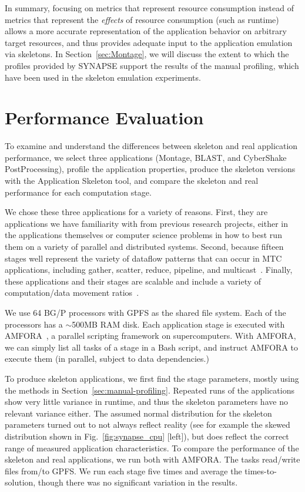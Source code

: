 \documentclass[preprint,12pt]{elsarticle}
\newcommand{\amnote}[1]{{\textcolor{magenta}    { ***Andre: #1 }}}
\newcommand{\amnote}[1]{}
\newcommand{\I}[1]{\textit{#1}\xspace}
\begin{document}
In summary, focusing on metrics that represent resource consumption
instead of metrics that represent the \I{effects} of resource
consumption (such as runtime) allows a more accurate representation of
the application behavior on arbitrary target resources, and thus
provides adequate input to the application emulation via skeletons.
In Section~\ref{sec:Montage}, we will discuss the extent to which the
profiles provided by SYNAPSE support the results of the manual
profiling, which have been used in the skeleton emulation experiments.


\section{Performance Evaluation}
\label{lb:Perf}
To examine and understand the differences between skeleton and real application performance, 
we select three applications (Montage, BLAST, and CyberShake PostProcessing), profile the application properties, 
produce the skeleton versions with the Application Skeleton tool, and compare the skeleton and real 
performance for each computation stage.

We chose these three applications for a variety of reasons.  First, they are applications we have familiarity with from previous research projects, either in the applications themselves or computer science problems in how to best run them on a variety of parallel and distributed systems.  Second, because fifteen stages well represent the variety of dataflow patterns that can occur in MTC applications, including gather, scatter, reduce, pipeline, and multicast~\cite{AMFS2012}. Finally, these applications and their stages are scalable and include a variety of computation/data movement ratios~\cite{ENVELOPE}.

We use 64 BG/P processors with GPFS as the shared file system. Each of the processors has a $\sim$500MB
RAM disk. Each application stage is executed with AMFORA~\cite{AMFS2013}, a parallel scripting framework on supercomputers.
With AMFORA, we can simply list all tasks of a stage in a Bash script, and instruct AMFORA to execute them (in parallel, subject to data dependencies.)

To produce skeleton applications, we first find the stage parameters,
mostly using the methods in Section~\ref{sec:manual-profiling}.
Repeated runs of the applications show very little variance in
runtime, and thus the skeleton parameters have no relevant variance
either.  The assumed normal distribution for the skeleton parameters
turned out to not always reflect reality (see for example the skewed
distribution shown in Fig.~\ref{fig:synapse_cpu} [left]), but does reflect
the correct range of measured application characteristics.
% 
To compare the performance of the skeleton and real applications, we run both with AMFORA. The tasks read/write files from/to GPFS.
We run each stage five times and average the times-to-solution, though there was no significant variation in the results.
\end{document}
